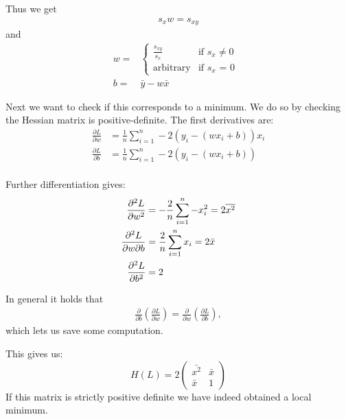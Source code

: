 Thus we get 
\begin{align}
  s_{x} w = s_{xy}
\end{align}
and
\begin{align}
w =& \begin{cases}
    \frac{s_{xy}}{s_{x}} & \text{if $s_{x} \neq 0$ }\\
    \text{arbitrary} & \text{if $s_{x}$ = 0 }
  \end{cases}\\
  b=&\bar{y}-w\bar{x} 
\end{align}

Next we want to check if this corresponds to a minimum. We do so 
by checking the Hessian matrix is positive-definite.
The first derivatives are:
\begin{align}
    \frac{\partial L}{\partial w} &= \frac{1}{n}\sum_{i=1}^{n}-2(y_{i}-(wx_{i}+b))x_{i}\\
    \frac{\partial L}{\partial b} &= \frac{1}{n}\sum_{i=1}^{n}-2(y_{i}-(wx_{i}+b))\\
\end{align}

Further differentiation gives:
\begin{align}
    \pdv[2]{L}{w}                 &= -\frac{2}{n}\sum_{i=1}^{n}-x_{i}^2 = 2 \overline{x^2} \\
    \pdv{L}{w}{b}                 &= \frac{2}{n}\sum_{i=1}^{n}x_{i} = 2\bar{x}\\
    \pdv[2]{L}{b}                 &= 2
\end{align}

In general it holds that 
\begin{align}
  \frac{\partial}{\partial b} \left(\frac{\partial L}{\partial w}\right)= \frac{\partial}{\partial w} \left(\frac{\partial L}{\partial b}\right),
\end{align}
which lets us save some computation.

This gives us:
\begin{equation*}
  H(L) = 2 
  \begin{pmatrix}
      \bar{x^2} & \bar{x} \\
      \bar{x} & 1 
  \end{pmatrix}
\end{equation*}
If this matrix is strictly positive definite
we have indeed obtained a local minimum.

